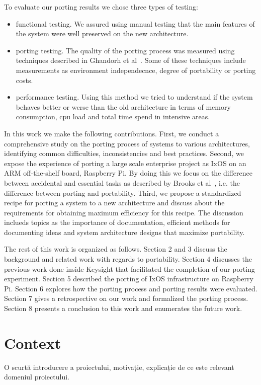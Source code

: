 \documentclass[12pt,a4paper]{report}
\begin{document}
To evaluate our porting results we chose three types of testing:
\begin{itemize}
	\item functional testing. We assured using manual testing that the main features of the
		system were well preserved on the new architecture.
	\item porting testing. The quality of the porting process was measured using techniques
		described in Ghandorh et al~\cite{ghandorh2020systematic}. Some of these techniques
		include measurements as environment independecnce, degree of portability or porting
		costs.
	\item performance testing. Using this method we tried to understand if the system behaves
		better or werse than the old architecture in terms of memory consumption, cpu load
		and total time spend in intensive areas.
\end{itemize}

In this work we make the following contributions. First, we conduct a comprehensive study on the
porting process of systems to various architectures, identifying common difficulties,
inconsistencies and best practices. Second, we expose the experience of porting a large scale
enterprise project as IxOS on an ARM off-the-shelf board, Raspberry Pi. By doing this we focus on
the difference between accidental and essential tasks as described by Brooks et al~\cite{brooks1987no},
i.e. the difference between porting and portability. Third, we propose a
standardized recipe for porting a system to a new architecture and discuss about the requirements
for obtaining maximum efficiency for this recipe. The discussion inclueds topics as the
importance of documentation, efficient methods for documenting ideas and system architecture designs
that maximize portability.

The rest of this work is organized as follows. Section 2 and 3 discuss the background and related
work with regards to portability. Section 4 discusses the previous work done inside Keysight that
facilitated the completion of our porting experiment. Section 5 described the porting of IxOS
infrastructure on Raspberry Pi. Section 6 explores how the porting process and porting results were
evaluated. Section 7 gives a retrospective on our work and formalized the porting process. Section
8 presents a conclusion to this work and enumerates the future work.

\section{Context}
O scurtă introducere a proiectului, motivație, explicație de ce este relevant domeniul proiectului.
\end{document}
